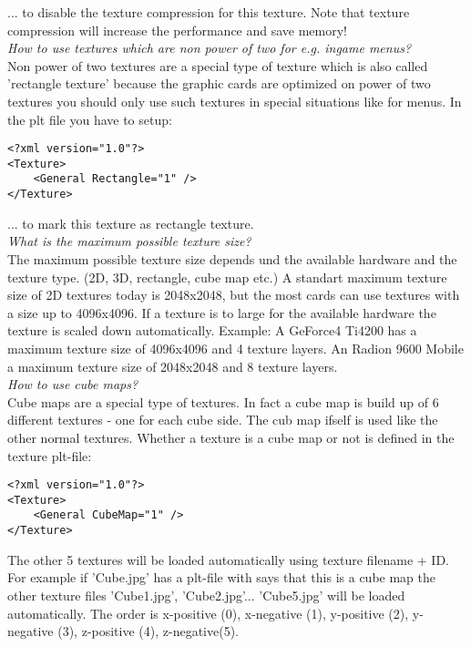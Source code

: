 ... to disable the texture compression for this texture. Note that texture compression will
increase the performance and save memory!\\


\emph{How to use textures which are non power of two for e.g. ingame menus?}\\
Non power of two textures are a special type of texture which is also called 'rectangle texture'
because the graphic cards are optimized on power of two textures you should only use such
textures in special situations like for menus. In the plt file you have to setup:\\

\begin{lstlisting}[caption=plt-file rectangle texture]
<?xml version="1.0"?>
<Texture>
	<General Rectangle="1" />
</Texture>
\end{lstlisting}

... to mark this texture as rectangle texture.\\


\emph{What is the maximum possible texture size?}\\
The maximum possible texture size depends und the available hardware and the texture type.
(2D, 3D, rectangle, cube map etc.)
A standart maximum texture size of 2D textures today is 2048x2048, but the most cards can use
textures with a size up to 4096x4096. If a texture is to large for the available hardware the
texture is scaled down automatically. Example: A GeForce4 Ti4200 has a maximum texture size of
4096x4096 and 4 texture layers. An Radion 9600 Mobile a maximum texture size of 2048x2048 and
8 texture layers.\\


\emph{How to use cube maps?}\\
Cube maps are a special type of textures. In fact a cube map is build up of 6 different textures -
one for each cube side. The cub map ifself is used like the other normal textures. Whether a
texture is a cube map or not is defined in the texture plt-file:\\

\begin{lstlisting}[caption=plt-file cube map]
<?xml version="1.0"?>
<Texture>
	<General CubeMap="1" />
</Texture>
\end{lstlisting}

The other 5 textures will be loaded automatically using texture filename + ID. For example if
'Cube.jpg' has a plt-file with says that this is a cube map the other texture files 'Cube1.jpg',
'Cube2.jpg'... 'Cube5.jpg' will be loaded automatically. The order is x-positive (0), x-negative (1),
y-positive (2), y-negative (3), z-positive (4), z-negative(5).\\


